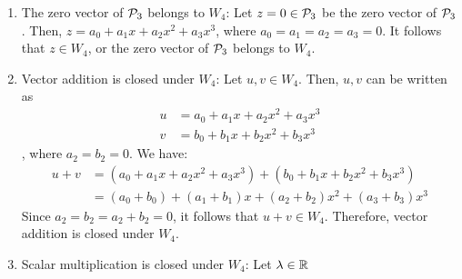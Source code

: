 \begin{sol}
\begin{enumerate}[(i)]
    \begin{enumerate}[(1)]
        \item The zero vector of $\P_3$ belongs to $W_4$: Let $z=0\in\P_3$ be the zero vector of $\P_3$. Then, $z=a_0+a_1x+a_2x^{2}+a_3x^{3}$, where $a_0=a_1=a_2=a_3=0$. It follows that $z\in W_4$, or the zero vector of $\P_3$ belongs to $W_4$.
        \item Vector addition is closed under $W_4$: Let $u,v\in W_4$. Then, $u, v$ can be written as
        \[
            \begin{aligned}
                u &= a_0+a_1x+a_2x^{2}+a_3x^{3}\\
                v &= b_0+b_1x+b_2x^{2}+b_3x^{3}
            \end{aligned}
        \]
        , where $a_2=b_2=0$. We have:
        \[
            \begin{aligned}
                u+v &= (a_0+a_1x+a_2x^{2}+a_3x^{3})+(b_0+b_1x+b_2x^{2}+b_3x^{3})\\
                    &= (a_0+b_0)+(a_1+b_1)x+(a_2+b_2)x^{2}+(a_3+b_3)x^{3}
            \end{aligned}
        \]
        Since $a_2=b_2=a_2+b_2=0$, it follows that $u+v\in W_4$. Therefore, vector addition is closed under $W_4$.
        \item Scalar multiplication is closed under $W_4$: Let $\lam\in\R$
    \end{enumerate}
\end{enumerate}
\end{sol}